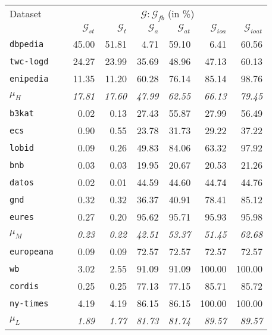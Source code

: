 %
\begin{tabular}{lc@{\hs}rrrrrr}
\toprule
Dataset & \phantom{a} & \multicolumn{6}{c}{$\mathcal{G}:\mathcal{G}_{fb}$ (in \%)} \\
\cmidrule{3-8}
 & \phantom{a} & $\mathcal{G}_{st}$ & $\mathcal{G}_{t}$ & $\mathcal{G}_{a}$ & $\mathcal{G}_{at}$ & $\mathcal{G}_{ioa}$ & $\mathcal{G}_{ioat}$ \\
\texttt{dbpedia} & \phantom{a} & 45.00 & 51.81 & 4.71 & 59.10 & 6.41 & 60.56 \\
\midrule
\texttt{twc-logd} & \phantom{a} & 24.27 & 23.99 & 35.69 & 48.96 & 47.13 & 60.13 \\
\texttt{enipedia} & \phantom{a} & 11.35 & 11.20 & 60.28 & 76.14 & 85.14 & 98.76 \\
$\mu_H$ & \phantom{a} & \emph{17.81} & \emph{17.60} & \emph{47.99} & \emph{62.55} & \emph{66.13} & \emph{79.45} \\
\midrule
\texttt{b3kat} & \phantom{a} & 0.02 & 0.13 & 27.43 & 55.87 & 27.99 & 56.49 \\
\texttt{ecs} & \phantom{a} & 0.90 & 0.55 & 23.78 & 31.73 & 29.22 & 37.22 \\
\texttt{lobid} & \phantom{a} & 0.09 & 0.26 & 49.83 & 84.06 & 63.32 & 97.92 \\
\texttt{bnb} & \phantom{a} & 0.03 & 0.03 & 19.95 & 20.67 & 20.53 & 21.26 \\
\texttt{datos} & \phantom{a} & 0.02 & 0.01 & 44.59 & 44.60 & 44.74 & 44.76 \\
\texttt{gnd} & \phantom{a} & 0.32 & 0.32 & 36.37 & 40.91 & 78.41 & 85.12 \\
\texttt{eures} & \phantom{a} & 0.27 & 0.20 & 95.62 & 95.71 & 95.93 & 95.98 \\
$\mu_M$ & \phantom{a} & \emph{0.23} & \emph{0.22} & \emph{42.51} & \emph{53.37} & \emph{51.45} & \emph{62.68} \\
\midrule
\texttt{europeana} & \phantom{a} & 0.09 & 0.09 & 72.57 & 72.57 & 72.57 & 72.57 \\
\texttt{wb} & \phantom{a} & 3.02 & 2.55 & 91.09 & 91.09 & 100.00 & 100.00 \\
\texttt{cordis} & \phantom{a} & 0.25 & 0.25 & 77.13 & 77.15 & 85.71 & 85.72 \\
\texttt{ny-times} & \phantom{a} & 4.19 & 4.19 & 86.15 & 86.15 & 100.00 & 100.00 \\
$\mu_L$ & \phantom{a} & \emph{1.89} & \emph{1.77} & \emph{81.73} & \emph{81.74} & \emph{89.57} & \emph{89.57} \\
\bottomrule
\end{tabular}%
%